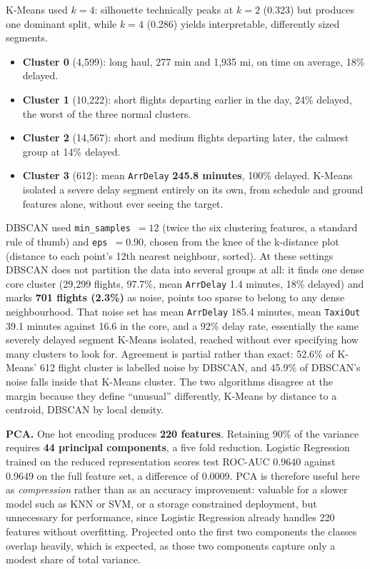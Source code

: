 \documentclass[11pt,a4paper]{article}
\newcommand{\metric}[1]{\textbf{\color{deep}#1}}
\begin{document}
K-Means used $k{=}4$: silhouette technically peaks at $k{=}2$ (0.323) but produces one
dominant split, while $k{=}4$ (0.286) yields interpretable, differently sized segments.

\begin{itemize}
  \item \textbf{Cluster 0} (4,599): long haul, 277 min and 1,935 mi, on time on average,
        18\% delayed.
  \item \textbf{Cluster 1} (10,222): short flights departing earlier in the day, 24\%
        delayed, the worst of the three normal clusters.
  \item \textbf{Cluster 2} (14,567): short and medium flights departing later, the
        calmest group at 14\% delayed.
  \item \textbf{Cluster 3} (612): mean \texttt{ArrDelay} \metric{245.8 minutes}, 100\%
        delayed. K-Means isolated a severe delay segment entirely on its own, from
        schedule and ground features alone, without ever seeing the target.
\end{itemize}

DBSCAN used \texttt{min\_samples}~$=12$ (twice the six clustering features, a standard
rule of thumb) and \texttt{eps}~$=0.90$, chosen from the knee of the k-distance plot
(distance to each point's 12th nearest neighbour, sorted). At these settings DBSCAN does
not partition the data into several groups at all: it finds one dense core cluster
(29,299 flights, 97.7\%, mean \texttt{ArrDelay} 1.4 minutes, 18\% delayed) and marks
\metric{701 flights (2.3\%)} as noise, points too sparse to belong to any dense
neighbourhood. That noise set has mean \texttt{ArrDelay} 185.4 minutes, mean
\texttt{TaxiOut} 39.1 minutes against 16.6 in the core, and a 92\% delay rate, essentially
the same severely delayed segment K-Means isolated, reached without ever specifying how
many clusters to look for. Agreement is partial rather than exact: 52.6\% of K-Means'
612 flight cluster is labelled noise by DBSCAN, and 45.9\% of DBSCAN's noise falls inside
that K-Means cluster. The two algorithms disagree at the margin because they define
``unusual'' differently, K-Means by distance to a centroid, DBSCAN by local density.

\textbf{PCA.} One hot encoding produces \metric{220 features}. Retaining 90\% of the
variance requires \metric{44 principal components}, a five fold reduction. Logistic
Regression trained on the reduced representation scores test ROC-AUC 0.9640 against
0.9649 on the full feature set, a difference of 0.0009. PCA is therefore useful here as
\emph{compression} rather than as an accuracy improvement: valuable for a slower model
such as KNN or SVM, or a storage constrained deployment, but unnecessary for performance,
since Logistic Regression already handles 220 features without overfitting. Projected
onto the first two components the classes overlap heavily, which is expected, as those
two components capture only a modest share of total variance.
\end{document}

